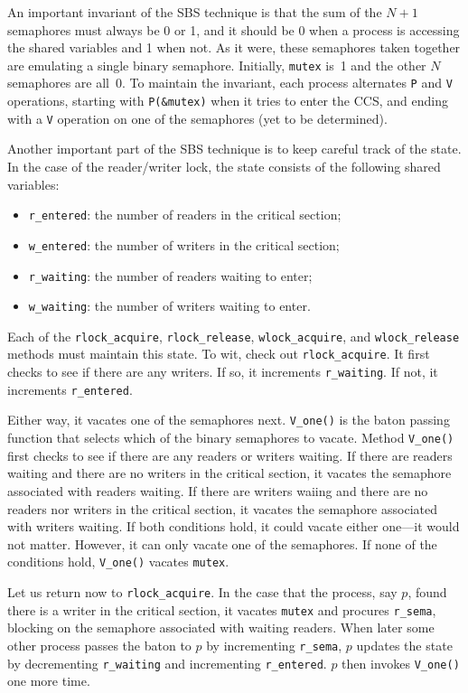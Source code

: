 \documentclass{report}
\begin{document}
An important invariant of the SBS technique is that the sum of the $N+1$ semaphores
must always be 0 or 1, and it should be 0 when a process is accessing the shared
variables and 1 when not.
As it were, these semaphores taken together are emulating a single binary semaphore.
Initially, \texttt{mutex} is~1 and the other $N$ semaphores
are all~0.  To maintain the invariant, each process alternates \texttt{P} and
\texttt{V} operations, starting with \texttt{P(\&mutex)} when it tries to
enter the CCS, and ending with a \texttt{V} operation on one of the semaphores
(yet to be determined).

Another important part of the SBS technique is to keep careful track of the
state.  In the case of the reader/writer lock, the state consists of the
following shared variables:
\begin{itemize}
\item \texttt{r\_entered}: the number of readers in the critical section;
\item \texttt{w\_entered}: the number of writers in the critical section;
\item \texttt{r\_waiting}: the number of readers waiting to enter;
\item \texttt{w\_waiting}: the number of writers waiting to enter.
\end{itemize}
Each of the
\texttt{rlock\_acquire}, \texttt{rlock\_release},
\texttt{wlock\_acquire}, and \texttt{wlock\_release} methods must maintain
this state.
To wit, check out \texttt{rlock\_acquire}.  It first checks to see if there
are any writers.  If so, it increments \texttt{r\_waiting}.  If not,
it increments \texttt{r\_entered}.

Either way, it vacates one of the semaphores next.
\texttt{V\_one()} is the baton passing function that selects which of the
binary semaphores to vacate.
Method \texttt{V\_one()} first checks to see if there are any readers or
writers waiting.  If there are readers waiting and there are no writers
in the critical section, it vacates the semaphore associated with
readers waiting.  If there are writers waiing and there are no readers
nor writers in the critical section, it vacates the semaphore associated
with writers waiting.  If both conditions hold, it could vacate either
one---it would not matter.  However, it can only vacate one of the semaphores.
If none of the conditions hold, \texttt{V\_one()} vacates \texttt{mutex}.

Let us return now to \texttt{rlock\_acquire}. In the case that the process,
say $p$,
found there is a writer in the critical section, it vacates
\texttt{mutex} and procures \texttt{r\_sema},
blocking on the semaphore associated
with waiting readers.  When later some other process passes the baton to
$p$ by incrementing \texttt{r\_sema}, $p$ updates the state by decrementing
\texttt{r\_waiting} and incrementing \texttt{r\_entered}.  $p$
then invokes \texttt{V\_one()} one more time.
\end{document}
